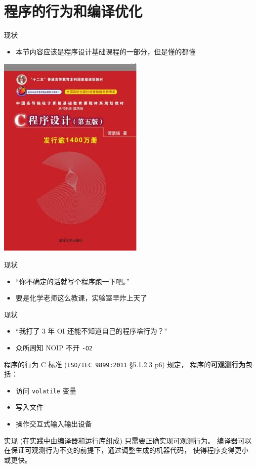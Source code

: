 \documentclass[10pt,mathserif]{beamer}
\begin{document}
\section{程序的行为和编译优化}
\sectionpage

\begin{frame}{现状}
	\begin{itemize}
		\item 本节内容应该是程序设计基础课程的一部分，但是懂的都懂
	\end{itemize}
	\begin{center}
		\includegraphics[width=.3\textwidth]{img/shit2.jpg}
	\end{center}
\end{frame}

\begin{frame}{现状}
	\begin{itemize}
		\item “你不确定的话就写个程序跑一下吧。”
			\pause
		\item 要是化学老师这么教课，实验室早炸上天了
	\end{itemize}
\end{frame}

\begin{frame}{现状}
	\begin{itemize}
		\item “我打了 3 年 OI 还能不知道自己的程序啥行为？”
			\pause
		\item 众所周知 NOIP 不开 \texttt{-O2}
	\end{itemize}
\end{frame}

\begin{frame}{程序的行为}
	C 标准 (\texttt{ISO/IEC 9899:2011} \S 5.1.2.3 p6) 规定，
	程序的\textbf{可观测行为}包括：
	\begin{itemize}
		\item 访问 \texttt{volatile} 变量
		\item 写入文件
		\item 操作交互式输入输出设备
	\end{itemize}
	实现 (在实践中由编译器和运行库组成) 只需要正确实现可观测行为。
	编译器可以在保证可观测行为不变的前提下，通过调整生成的机器代码，
	使得程序变得更小或更快。
\end{frame}
\end{document}
